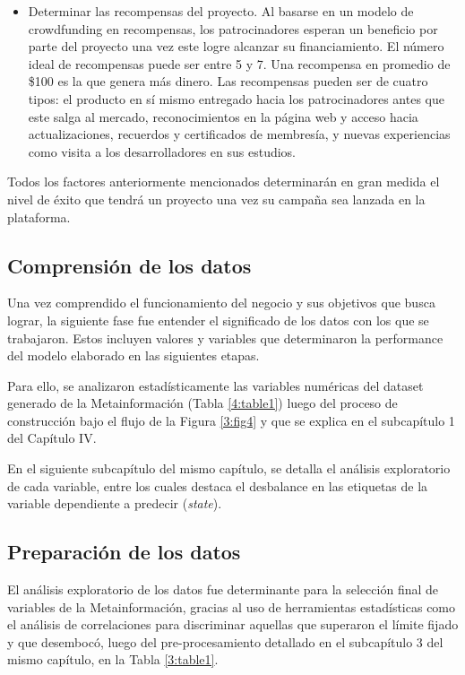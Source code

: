 \begin{itemize}
	\item Determinar las recompensas del proyecto. Al basarse en un modelo de crowdfunding en recompensas, los patrocinadores esperan un beneficio por parte del proyecto una vez este logre alcanzar su financiamiento. El número ideal de recompensas puede ser entre 5 y 7. Una recompensa en promedio de \$100 es la que genera más dinero. Las recompensas pueden ser de cuatro tipos: el producto en sí mismo entregado hacia los patrocinadores antes que este salga al mercado, reconocimientos en la página web y acceso hacia actualizaciones, recuerdos y certificados de membresía, y nuevas experiencias como visita a los desarrolladores en sus estudios.
\end{itemize}

Todos los factores anteriormente mencionados determinarán en gran medida el nivel de éxito que tendrá un proyecto una vez su campaña sea lanzada en la plataforma.

\subsection{Comprensión de los datos}
Una vez comprendido el funcionamiento del negocio y sus objetivos que busca lograr, la siguiente fase fue entender el significado de los datos con los que se trabajaron. Estos incluyen valores y variables que determinaron la performance del modelo elaborado en las siguientes etapas.

Para ello, se analizaron estadísticamente las variables numéricas del dataset generado de la Metainformación (Tabla \ref{4:table1}) luego del proceso de construcción bajo el flujo de la Figura \ref{3:fig4} y que se explica en el subcapítulo 1 del Capítulo IV.

En el siguiente subcapítulo del mismo capítulo, se detalla el análisis exploratorio de cada variable, entre los cuales destaca el desbalance en las etiquetas de la variable dependiente a predecir (\textit{state}).

\subsection{Preparación de los datos}
El análisis exploratorio de los datos fue determinante para la selección final de variables de la Metainformación, gracias al uso de herramientas estadísticas como el análisis de correlaciones para discriminar aquellas que superaron el límite fijado y que desembocó, luego del pre-procesamiento detallado en el subcapítulo 3 del mismo capítulo, en la Tabla \ref{3:table1}.

